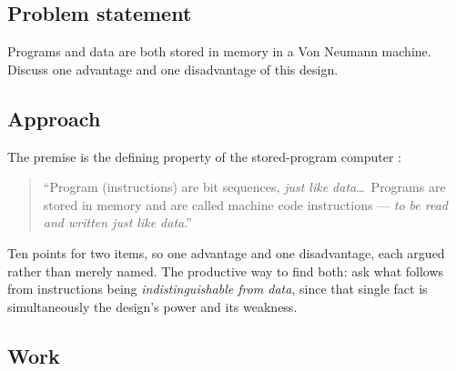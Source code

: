 





\subsection*{Problem statement}

Programs and data are both stored in memory in a Von Neumann machine. Discuss
one advantage and one disadvantage of this design.

\subsection*{Approach}

The premise is the defining property of the stored-program computer
:

\begin{quote}
``Program (instructions) are bit sequences, \emph{just like data}\ldots\
Programs are stored in memory and are called machine code instructions —
\emph{to be read and written just like data}.''
\end{quote}

Ten points for two items, so one advantage and one disadvantage, each argued
rather than merely named. The productive way to find both: ask what follows
from instructions being \emph{indistinguishable from data}, since that single fact
is simultaneously the design's power and its weakness.

\subsection*{Work}

